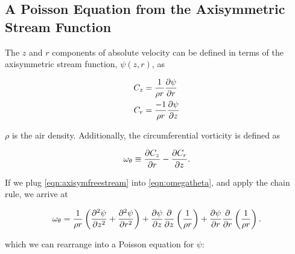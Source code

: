 


\subsection{A Poisson Equation from the Axisymmetric Stream Function}

The \(z\) and \(r\) components of absolute velocity can be defined in terms of the axisymmetric stream function, \(\psi(z,r)\), as

\begin{subequations}
    \label{eqn:axisymfreestream}
    \begin{align}
        C_z &= \frac{1}{\rho r}\frac{\partial \psi}{\partial r} \\
        C_r &= \frac{-1}{\rho r}\frac{\partial \psi}{\partial z}
    \end{align}
\end{subequations}

\where \(\rho \) is the air density.
%
Additionally, the circumferential vorticity is defined as

\begin{equation}
    \label{eqn:omegatheta}
    \omega_\theta \equiv \frac{\partial C_z}{\partial r} - \frac{\partial C_r}{\partial z}.
\end{equation}

\noindent If we plug \cref{eqn:axisymfreestream} into \cref{eqn:omegatheta}, and apply the chain rule, we arrive at

\begin{equation}
    \omega_\theta = \frac{1}{\rho r} \left(\frac{\partial^2 \psi}{\partial z^2} + \frac{\partial^2 \psi}{\partial r^2} \right) + \frac{\partial \psi}{\partial z} \frac{\partial }{\partial z}\left( \frac{1}{\rho r} \right) + \frac{\partial \psi}{\partial r} \frac{\partial }{\partial r}\left( \frac{1}{\rho r} \right).
\end{equation}

\noindent which we can rearrange into a Poisson equation for \(\psi\):

